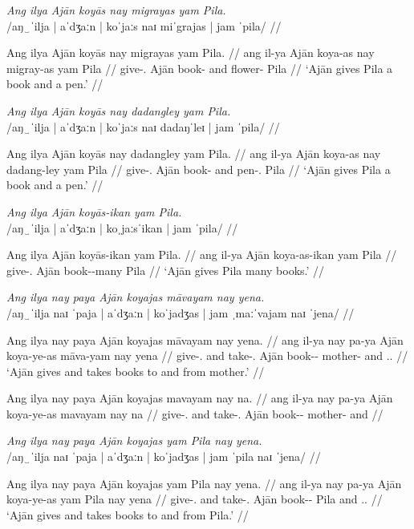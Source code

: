 \documentclass[12pt,a4paper]{scrartcl}
\newcommand{\PargI}{{\Parg}.{\Inan}}
\newcommand{\TsgM}{{\Tsg}.{\M}}
\newcommand{\TsgF}{{\Tsg}.{\F}}
\begin{document}
\ex\begingl
\glpreamble \textit{Ang ilya Ajān koyās nay migrayas yam Pila.}\\
	/aŋ‿ˈilja | aˈdʒaːn | koˈjaːs naɪ miˈgrajas | jam ˈpila/ //

\gla Ang ilya Ajān koyās nay migrayas yam Pila. //
\glb ang il-ya Ajān koya-as nay migray-as yam Pila //
\glc \AgtT{} give-\TsgM{} Ajān book-\Parg{} and flower-\Parg{} \Dat{} Pila //
\glft `Ajān gives Pila a book and a pen.' //
\endgl\xe

\ex\begingl
\glpreamble \textit{Ang ilya Ajān koyās nay dadangley yam Pila.}\\
	/aŋ‿ˈilja | aˈdʒaːn | koˈjaːs naɪ dadaŋˈleɪ | jam ˈpila/ //

\gla Ang ilya Ajān koyās nay dadangley yam Pila. //
\glb ang il-ya Ajān koya-as nay dadang-ley yam Pila //
\glc \AgtT{} give-\TsgM{} Ajān book-\Parg{} and pen-\PargI{} \Dat{} Pila //
\glft `Ajān gives Pila a book and a pen.' //
\endgl\xe

\ex\begingl
\glpreamble \textit{Ang ilya Ajān koyās-ikan yam Pila.}\\
	/aŋ‿ˈilja | aˈdʒaːn | koˌjaːsˈikan | jam ˈpila/ //

\gla Ang ilya Ajān koyās-ikan yam Pila. //
\glb ang il-ya Ajān koya-as-ikan yam Pila //
\glc \AgtT{} give-\TsgM{} Ajān book-\Parg{}-many \Dat{} Pila //
\glft `Ajān gives Pila many books.' //
\endgl\xe

\pex
\a\begingl
\glpreamble \textit{Ang ilya nay paya Ajān koyajas māvayam nay yena.} \\
	/aŋ‿ˈilja naɪ ˈpaja | aˈdʒaːn | koˈjadʒas | jam ˌmaːˈvajam naɪ ˈjena/ //

\gla Ang ilya nay paya Ajān koyajas māvayam nay yena. //
\glb ang il-ya nay pa-ya Ajān koya-ye-as māva-yam nay yena //
\glc \AgtT{} give-\TsgM{} and take-\TsgM{} Ajān book-\Pl{}-\Parg{} mother-\Dat{} and \TsgF{}.\Gen{} //
\glft `Ajān gives and takes books to and from mother.' //
\endgl

\a\ljudge*\begingl
\gla Ang ilya nay paya Ajān koyajas mavayam nay na. //
\glb ang il-ya nay pa-ya Ajān koya-ye-as mavayam nay na //
\glc \AgtT{} give-\TsgM{} and take-\TsgM{} Ajān book-\Pl{}-\Parg{} mother-\Dat{} and \Gen{} //
\endgl

\xe

\pex
\a\begingl
\glpreamble \textit{Ang ilya nay paya Ajān koyajas yam Pila nay yena.} \\
	/aŋ‿ˈilja naɪ ˈpaja | aˈdʒaːn | koˈjadʒas | jam ˈpila naɪ ˈjena/ //

\gla Ang ilya nay paya Ajān koyajas yam Pila nay yena. //
\glb ang il-ya nay pa-ya Ajān koya-ye-as yam Pila nay yena //
\glc \AgtT{} give-\TsgM{} and take-\TsgM{} Ajān book-\Pl{}-\Parg{} \Dat{} Pila and \TsgF{}.\Gen{} //
\glft `Ajān gives and takes books to and from Pila.' //
\endgl
\end{document}
